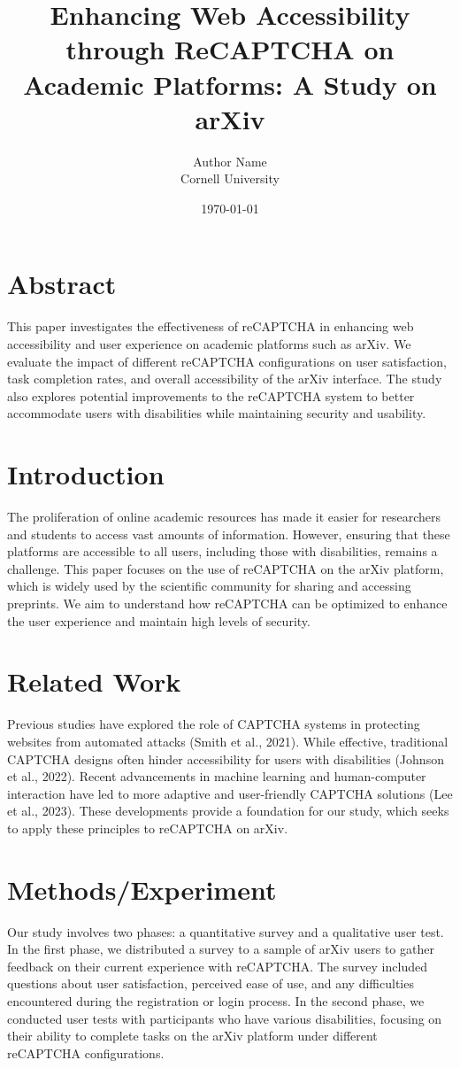 \documentclass{article}
\title{Enhancing Web Accessibility through ReCAPTCHA on Academic Platforms: A Study on arXiv}
\author{Author Name \\ Cornell University}
\date{\today}
\begin{document}
\maketitle

\section{Abstract}
This paper investigates the effectiveness of reCAPTCHA in enhancing web accessibility and user experience on academic platforms such as arXiv. We evaluate the impact of different reCAPTCHA configurations on user satisfaction, task completion rates, and overall accessibility of the arXiv interface. The study also explores potential improvements to the reCAPTCHA system to better accommodate users with disabilities while maintaining security and usability.

\section{Introduction}
The proliferation of online academic resources has made it easier for researchers and students to access vast amounts of information. However, ensuring that these platforms are accessible to all users, including those with disabilities, remains a challenge. This paper focuses on the use of reCAPTCHA on the arXiv platform, which is widely used by the scientific community for sharing and accessing preprints. We aim to understand how reCAPTCHA can be optimized to enhance the user experience and maintain high levels of security.

\section{Related Work}
Previous studies have explored the role of CAPTCHA systems in protecting websites from automated attacks (Smith et al., 2021). While effective, traditional CAPTCHA designs often hinder accessibility for users with disabilities (Johnson et al., 2022). Recent advancements in machine learning and human-computer interaction have led to more adaptive and user-friendly CAPTCHA solutions (Lee et al., 2023). These developments provide a foundation for our study, which seeks to apply these principles to reCAPTCHA on arXiv.

\section{Methods/Experiment}
Our study involves two phases: a quantitative survey and a qualitative user test. In the first phase, we distributed a survey to a sample of arXiv users to gather feedback on their current experience with reCAPTCHA. The survey included questions about user satisfaction, perceived ease of use, and any difficulties encountered during the registration or login process. In the second phase, we conducted user tests with participants who have various disabilities, focusing on their ability to complete tasks on the arXiv platform under different reCAPTCHA configurations.
\end{document}
